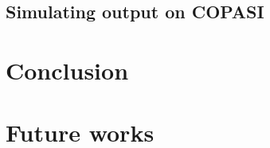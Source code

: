 \documentclass[12pt]{article}
\begin{document}
    
    

\subsection{Simulating output on COPASI}
    \lipsum[1]

\section{Conclusion}
    \lipsum[1]
    
\section{Future works}
    \lipsum[1]



\end{document}
